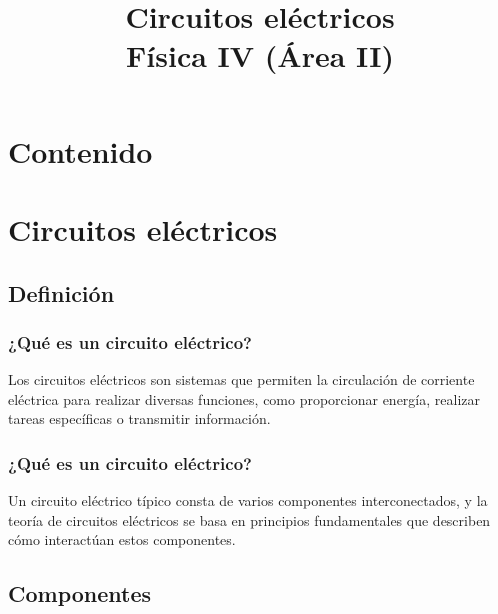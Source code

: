 \documentclass[14pt]{beamer}
\title{\Large{Circuitos eléctricos} \\ \normalsize{Física IV (Área II)}}
\date{}
\begin{document}
\maketitle

\section*{Contenido}

\section{Circuitos eléctricos}
\subsection{Definición}

\begin{frame}
\frametitle{¿Qué es un circuito eléctrico?}
Los circuitos eléctricos son sistemas que permiten la circulación de corriente eléctrica para realizar diversas funciones, \pause como proporcionar energía, realizar tareas específicas o transmitir información.
\end{frame}
\begin{frame}
\frametitle{¿Qué es un circuito eléctrico?}
Un circuito eléctrico típico consta de varios componentes interconectados, \pause y la teoría de circuitos eléctricos se basa en principios fundamentales que describen cómo interactúan estos componentes.
\end{frame}

\subsection{Componentes}
\end{document}
